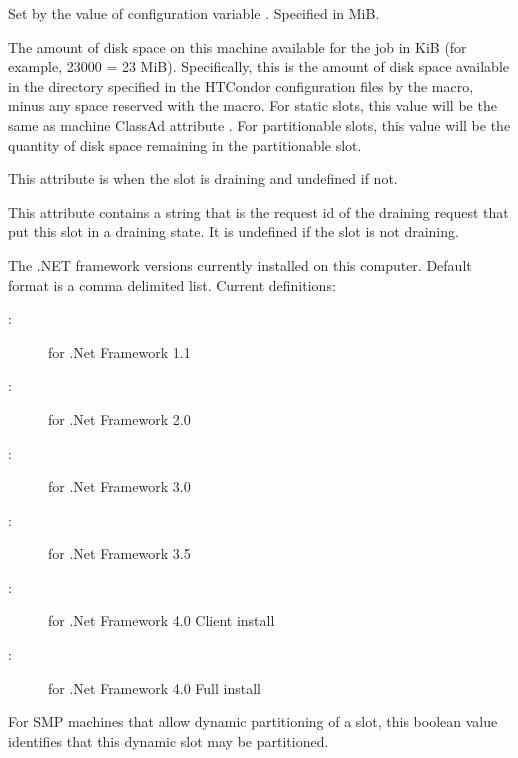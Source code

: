 \begin{description}
\item[\AdAttr{DetectedMemory}:] 
Set by the value of configuration variable .
Specified in MiB.

\item[\AdAttr{Disk}:] The amount of disk space on this machine available for
the job in KiB (for example, 23000 = 23 MiB).  Specifically, this
is the amount of disk space available in the directory specified in
the HTCondor configuration files by the  macro, minus any
space reserved with the  macro.
For static slots, this value will be the same as
machine ClassAd attribute .  
For partitionable slots,
this value will be the quantity of disk space remaining in the partitionable
slot.
%
\item[\AdAttr{Draining}:] This attribute is  when the slot
is draining and undefined if not.
%
\item[\AdAttr{DrainingRequestId}:] This attribute contains a string that
is the request id of the draining request that put this slot in a draining
state.  It is undefined if the slot is not draining.
%
\item[\AdAttr{DotNetVersions}:] The .NET framework versions
currently installed on this computer. 
Default format is a comma delimited list. 
Current definitions:
  \begin{description}
  \item[:] for .Net Framework 1.1
  \item[:] for .Net Framework 2.0
  \item[:] for .Net Framework 3.0
  \item[:] for .Net Framework 3.5
  \item[:] for .Net Framework 4.0 Client install
  \item[:] for .Net Framework 4.0 Full install
  \end{description}
%
\label{DynamicSlot-machine-attribute} 
\item[\AdAttr{DynamicSlot}:] For SMP machines that allow dynamic
partitioning of a slot,
this boolean value identifies that this dynamic slot may be partitioned.
%

\end{description}
